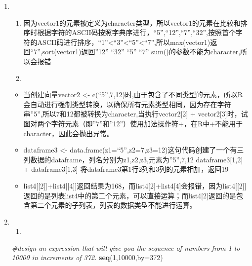\documentclass[
]{article}
\newenvironment{Shaded}{\begin{snugshade}}{\end{snugshade}}
\newcommand{\AttributeTok}[1]{\textcolor[rgb]{0.13,0.29,0.53}{#1}}
\newcommand{\CommentTok}[1]{\textcolor[rgb]{0.56,0.35,0.01}{\textit{#1}}}
\newcommand{\DecValTok}[1]{\textcolor[rgb]{0.00,0.00,0.81}{#1}}
\newcommand{\FunctionTok}[1]{\textcolor[rgb]{0.13,0.29,0.53}{\textbf{#1}}}
\newcommand{\NormalTok}[1]{#1}
\providecommand{\tightlist}{%
  \setlength{\itemsep}{0pt}\setlength{\parskip}{0pt}}
\begin{document}
\begin{enumerate}
\def\labelenumi{\arabic{enumi}.}
\setcounter{enumi}{1}
\item
  \begin{enumerate}
  \def\labelenumii{\alph{enumii}.}
  \tightlist
  \item
    因为vector1的元素被定义为character类型，所以vector1的元素在比较和排序时根据字符的ASCII码按照字典序进行，``5'',``12'',``7'',``32'',按照首个字符的ASCII码进行排序，``1''\textless{}``3''\textless{}``5''\textless{}``7'',所以max(vector1)返回``7'',sort(vector1)返回''12''
    ``32'' ``5'' ``7'' sum()的参数不能为character,所以会报错
  \item
  \end{enumerate}

  \begin{itemize}
  \tightlist
  \item
    当创建向量vector2 \textless-
    c(``5'',7,12)时,由于包含了不同类型的元素，所以R会自动进行强制类型转换，以确保所有元素类型相同，因为存在字符串''5'',所以7和12都被转换为character,当执行vector2{[}2{]}
    +
    vector2{[}3{]}时，试图对两个字符元素（即''7''和''12''）使用加法操作符+，在R中+不能用于character，因此会抛出异常。
  \item
    dataframe3 \textless-
    data.frame(z1=``5'',z2=7,z3=12)这句代码创建了一个有三列数据的dataframe，列名分别为z1,z2,z3,元素为''5'',7,12
    dataframe3{[}1,2{]} + dataframe3{[}1,3{]}
    将dataframe3第1行2列和3列的元素相加，返回19
  \item
    list4{[}{[}2{]}{]}+list4{[}{[}4{]}{]}返回结果为168，而list4{[}2{]}+list4{[}4{]}会报错，因为list4{[}{[}2{]}{]}返回的是列表list4中的第二个元素，可以直接运算；而list4{[}2{]}返回的是包含第二个元素的子列表，列表的数据类型不能进行运算。
  \end{itemize}
\item
  \begin{enumerate}
  \def\labelenumii{\alph{enumii}.}
  \tightlist
  \item
  \end{enumerate}

\begin{Shaded}
\begin{Highlighting}[]
 \CommentTok{\#design an expression that will give you the sequence of numbers from 1 to 10000 in increments of 372.}
\FunctionTok{seq}\NormalTok{(}\DecValTok{1}\NormalTok{,}\DecValTok{10000}\NormalTok{,}\AttributeTok{by=}\DecValTok{372}\NormalTok{)}
\end{Highlighting}
\end{Shaded}


\end{enumerate}
\end{document}
